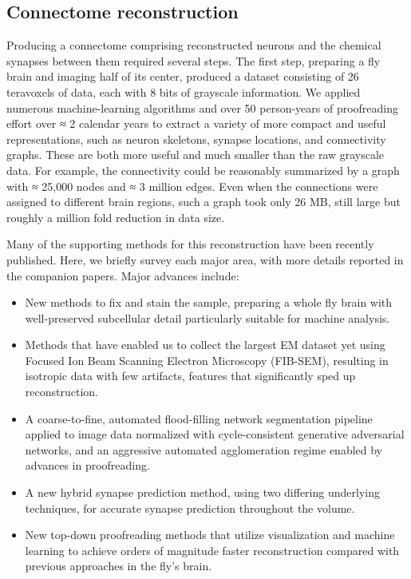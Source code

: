 \documentclass{article}
\begin{document}
\subsection*{Connectome reconstruction}

Producing a connectome comprising reconstructed neurons and the chemical synapses between them required several steps. The first step, preparing a fly brain and imaging half of its center, produced a dataset consisting of 26 teravoxels of data, each with 8 bits of grayscale information. We applied numerous machine-learning algorithms and over 50 person-years of proofreading effort over ≈ 2 calendar years to extract a variety of more compact and useful representations, such as neuron skeletons, synapse locations, and connectivity graphs. These are both more useful and much smaller than the raw grayscale data. For example, the connectivity could be reasonably summarized by a graph with ≈ 25,000 nodes and ≈ 3 million edges. Even when the connections were assigned to different brain regions, such a graph took only 26 MB, still large but roughly a million fold reduction in data size.


Many of the supporting methods for this reconstruction have been recently published. Here, we briefly survey each major area, with more details reported in the companion papers. Major advances include:

\begin{itemize}
\item New methods to fix and stain the sample, preparing a whole fly brain with well-preserved subcellular detail particularly suitable for machine analysis.
\item Methods that have enabled us to collect the largest EM dataset yet using Focused Ion Beam Scanning Electron Microscopy (FIB-SEM), resulting in isotropic data with few artifacts, features that significantly sped up reconstruction.
\item A coarse-to-fine, automated flood-filling network segmentation pipeline applied to image data normalized with cycle-consistent generative adversarial networks, and an aggressive automated agglomeration regime enabled by advances in proofreading.
\item A new hybrid synapse prediction method, using two differing underlying techniques, for accurate synapse prediction throughout the volume.
\item New top-down proofreading methods that utilize visualization and machine learning to achieve orders of magnitude faster reconstruction compared with previous approaches in the fly’s brain.
\end{itemize}
\end{document}
